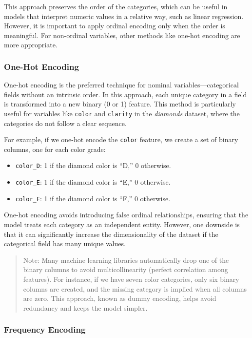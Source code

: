 \documentclass[
  11pt,
]{book}
\providecommand{\tightlist}{%
  \setlength{\itemsep}{0pt}\setlength{\parskip}{0pt}}
\renewenvironment{quote}{\begin{quotation}}{\end{quotation}}
\theoremstyle{definition}
\theoremstyle{definition}
\theoremstyle{definition}
\theoremstyle{definition}
\theoremstyle{remark}
\begin{document}
This approach preserves the order of the categories, which can be useful in models that interpret numeric values in a relative way, such as linear regression. However, it is important to apply ordinal encoding only when the order is meaningful. For non-ordinal variables, other methods like one-hot encoding are more appropriate.

\subsubsection*{One-Hot Encoding}\label{one-hot-encoding}


One-hot encoding is the preferred technique for nominal variables---categorical fields without an intrinsic order. In this approach, each unique category in a field is transformed into a new binary (0 or 1) feature. This method is particularly useful for variables like \texttt{color} and \texttt{clarity} in the \emph{diamonds} dataset, where the categories do not follow a clear sequence.

For example, if we one-hot encode the \texttt{color} feature, we create a set of binary columns, one for each color grade:

\begin{itemize}
\tightlist
\item
  \texttt{color\_D}: 1 if the diamond color is ``D,'' 0 otherwise.
\item
  \texttt{color\_E}: 1 if the diamond color is ``E,'' 0 otherwise.
\item
  \texttt{color\_F}: 1 if the diamond color is ``F,'' 0 otherwise.
\end{itemize}

One-hot encoding avoids introducing false ordinal relationships, ensuring that the model treats each category as an independent entity. However, one downside is that it can significantly increase the dimensionality of the dataset if the categorical field has many unique values.

\begin{quote}
Note: Many machine learning libraries automatically drop one of the binary columns to avoid multicollinearity (perfect correlation among features). For instance, if we have seven color categories, only six binary columns are created, and the missing category is implied when all columns are zero. This approach, known as dummy encoding, helps avoid redundancy and keeps the model simpler.
\end{quote}

\subsubsection*{Frequency Encoding}\label{frequency-encoding}
\end{document}
